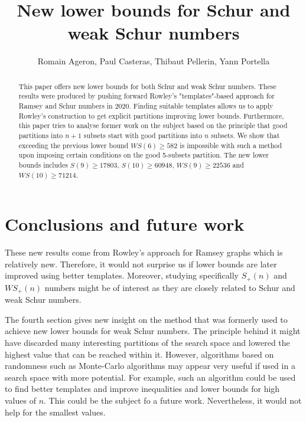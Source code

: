 \documentclass{article}
\title{New lower bounds for Schur and weak Schur numbers}
\author{Romain Ageron, Paul Casteras, Thibaut Pellerin, Yann Portella}
\newtheorem{computational theorem}{Computational Theorem}[section]
\begin{document}
\maketitle

\begin{abstract}

This paper offers new lower bounds for both Schur and weak Schur numbers. These results were produced by pushing forward
Rowley's "templates"-based approach for Ramsey and Schur numbers in 2020. Finding suitable templates allows us to apply Rowley's construction
to get explicit partitions improving lower bounds. Furthermore, this paper tries to analyse former work on the subject based on
the principle that good partitions into \(n+1\) subsets start with good partitions into \(n\) subsets. We show that exceeding
the previous lower bound \(WS(6) \geqslant 582\) is impossible with such a method upon imposing certain conditions on the good
5-subsets partition. The new lower bounds includes \(S(9) \geqslant 17803\), \(S(10) \geqslant 60948\), \(WS(9) \geqslant 22536 \) and \(WS(10) \geqslant 71214 \).

\end{abstract}










\section{Conclusions and future work}

\par
These new results come from Rowley's approach for Ramsey graphs which is relatively new. Therefore, it would not surprise us
if lower bounds are later improved using better templates. Moreover, studying specifically \(S_+(n)\) and \(WS_+(n)\) numbers might be
of interest as they are closely related to Schur and weak Schur numbers.

\par
The fourth section gives new insight on the method that was formerly used to achieve new lower bounds for weak Schur numbers. The principle behind it
might have discarded many interesting partitions of the search space and lowered the highest value that can be reached within it.
However, algorithms based on randomness such as Monte-Carlo algorithms may appear very useful if used in a search space with more
potential. For example, such an algorithm could be used to find better templates and improve inequalities and lower bounds for high values
of \(n\). This could be the subject fo a future work. Nevertheless, it would not help for the smallest values.
\end{document}
